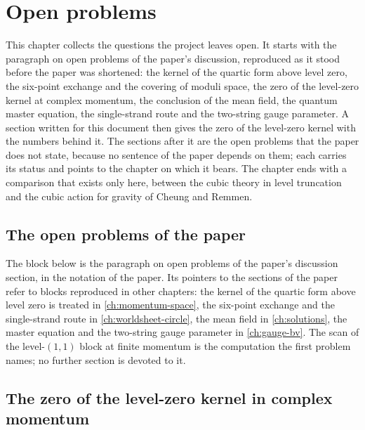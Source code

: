 \section{Open problems}
\label{ch:open-problems}

This chapter collects the questions the project leaves open.
It starts with the paragraph on open problems of the paper's discussion, reproduced as it stood before the paper was shortened: the kernel of the quartic form above level zero, the six-point exchange and the covering of moduli space, the zero of the level-zero kernel at complex momentum, the conclusion of the mean field, the quantum master equation, the single-strand route and the two-string gauge parameter.
A section written for this document then gives the zero of the level-zero kernel with the numbers behind it.
The sections after it are the open problems that the paper does not state, because no sentence of the paper depends on them; each carries its status and points to the chapter on which it bears.
The chapter ends with a comparison that exists only here, between the cubic theory in level truncation and the cubic action for gravity of Cheung and Remmen.

\subsection{The open problems of the paper}
\label{sec:open:paper}

The block below is the paragraph on open problems of the paper's discussion section, in the notation of the paper.
Its pointers to the sections of the paper refer to blocks reproduced in other chapters: the kernel of the quartic form above level zero is treated in \cref{ch:momentum-space}, the six-point exchange and the single-strand route in \cref{ch:worldsheet-circle}, the mean field in \cref{ch:solutions}, the master equation and the two-string gauge parameter in \cref{ch:gauge-bv}.
The scan of the level-$(1, 1)$ block at finite momentum is the computation the first problem names; no further section is devoted to it.



\subsection{The zero of the level-zero kernel in complex momentum}
\label{sec:open:level-zero-zero}

